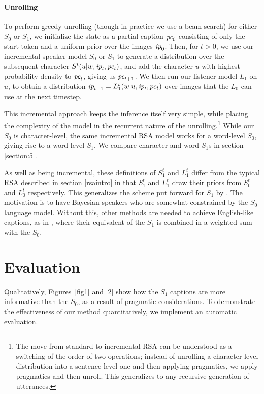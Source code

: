 \documentclass[11pt,a4paper]{article}
\begin{document}
\paragraph{Unrolling} To perform greedy unrolling (though in practice we use a beam search) for either $S_0$ or $S_1$, we initialize the state as a partial caption $\emph{pc}_{0}$ consisting of only the start token and a uniform prior over the images $\emph{ip}_{0}$. 
Then, for $t > 0$, we use our incremental speaker model $S_0$ or $S_1$ to generate a distribution over the subsequent character $S^{t}(u | w,\emph{ip}_t,\emph{pc}_t)$, and add the character $u$ with highest probability density to $\emph{pc}_t$, giving us $\emph{pc}_{t+1}$. We then run our listener model $L_1$ on $u$, to obtain a distribution $\emph{ip}_{t+1}=L_{1}^{t}(w | u,\emph{ip}_t,pc_{t})$ over images that the $L_0$ can use at the next timestep.

This incremental approach keeps the inference itself very simple, while placing the complexity of the model in the recurrent nature of the unrolling.\footnote{The move from standard to incremental RSA can be understood as a switching of the order of two operations; instead of unrolling a character-level distribution into a sentence level one and then applying pragmatics, we apply pragmatics and then unroll. This generalizes to any recursive generation of utterances.}  While our $S_0$ is character-level, the same incremental RSA model works for a word-level $S_0$, giving rise to a word-level $S_1$. We compare character and word $S_1$s in section \ref{section:5}.

As well as being incremental, these definitions of $S_1^{t}$ and $L_1^{t}$ differ from the typical RSA described in section \ref{rsaintro} in that $S_1^{t}$ and $L_1^{t}$ draw their priors from $S_{0}^{t}$ and $L_{0}^{t}$ respectively. This generalizes the scheme put forward for $S_1$ by . The motivation is to have Bayesian speakers who are somewhat constrained by the $S_0$ language model. Without this, other methods are needed to achieve English-like captions, as in , where their equivalent of the $S_1$ is combined in a weighted sum with the $S_0$. 

\section{Evaluation}

Qualitatively, Figures~\ref{fig1} and \ref{2} show how the $S_1$ captions are more informative than the $S_0$, as a result of pragmatic considerations. To demonstrate the effectiveness of our method quantitatively, we implement an automatic evaluation. 
\end{document}
